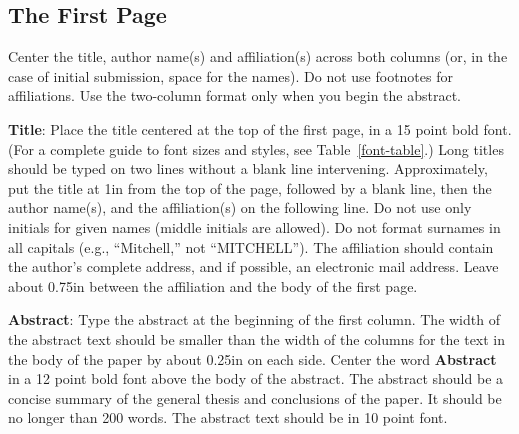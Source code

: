 \documentclass[11pt]{article}
\begin{document}
\subsection{The First Page}
\label{ssec:first}

Center the title, author name(s) and affiliation(s) across both
columns (or, in the case of initial submission, space for the names). 
Do not use footnotes for affiliations.  
Use the two-column format only when you begin the abstract.

{\bf Title}: Place the title centered at the top of the first page, in
a 15 point bold font.  (For a complete guide to font sizes and styles, see Table~\ref{font-table}.)
Long titles should be typed on two lines without
a blank line intervening. Approximately, put the title at 1in from the
top of the page, followed by a blank line, then the author name(s),
and the affiliation(s) on the following line.  Do not use only initials
for given names (middle initials are allowed). Do not format surnames
in all capitals (e.g., ``Mitchell,'' not ``MITCHELL'').  The affiliation should
contain the author's complete address, and if possible, an electronic
mail address. Leave about 0.75in between the affiliation and the body
of the first page.

{\bf Abstract}: Type the abstract at the beginning of the first
column.  The width of the abstract text should be smaller than the
width of the columns for the text in the body of the paper by about
0.25in on each side.  Center the word {\bf Abstract} in a 12 point
bold font above the body of the abstract. The abstract should be a
concise summary of the general thesis and conclusions of the paper.
It should be no longer than 200 words.  The abstract text should be in 10 point font.
\end{document}
